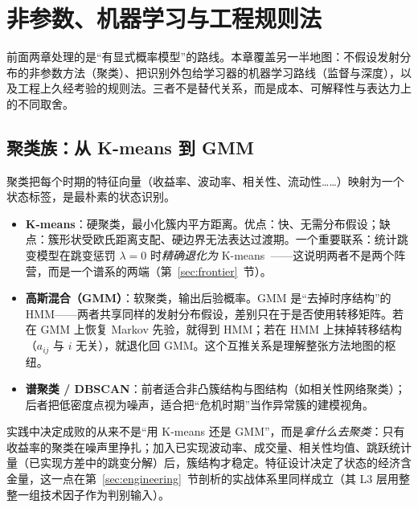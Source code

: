 
\section{非参数、机器学习与工程规则法}

前面两章处理的是“有显式概率模型”的路线。本章覆盖另一半地图：不假设发射分布的非参数方法（聚类）、把识别外包给学习器的机器学习路线（监督与深度），以及工程上久经考验的规则法。三者不是替代关系，而是成本、可解释性与表达力上的不同取舍。

\subsection{聚类族：从 K-means 到 GMM}

聚类把每个时期的特征向量（收益率、波动率、相关性、流动性……）映射为一个状态标签，是最朴素的状态识别。

\begin{itemize}[itemsep=2pt]
\item \textbf{K-means}：硬聚类，最小化簇内平方距离。优点：快、无需分布假设；缺点：簇形状受欧氏距离支配、硬边界无法表达过渡期。一个重要联系：统计跳变模型在跳变惩罚 $\lambda = 0$ 时\emph{精确退化为} K-means~\cite{shu2024a}——这说明两者不是两个阵营，而是一个谱系的两端（第~\ref{sec:frontier}~节）。
\item \textbf{高斯混合（GMM）}：软聚类，输出后验概率。GMM 是“去掉时序结构”的 HMM——两者共享同样的发射分布假设，差别只在于是否使用转移矩阵。若在 GMM 上恢复 Markov 先验，就得到 HMM；若在 HMM 上抹掉转移结构（$a_{ij}$ 与 $i$ 无关），就退化回 GMM。这个互推关系是理解整张方法地图的枢纽。
\item \textbf{谱聚类 / DBSCAN}：前者适合非凸簇结构与图结构（如相关性网络聚类）；后者把低密度点视为噪声，适合把“危机时期”当作异常簇的建模视角。
\end{itemize}

\begin{remark}[聚类的真正难点是特征而不是算法]
实践中决定成败的从来不是“用 K-means 还是 GMM”，而是\emph{拿什么去聚类}：只有收益率的聚类在噪声里挣扎；加入已实现波动率、成交量、相关性均值、跳跃统计量（已实现方差中的跳变分解）后，簇结构才稳定。特征设计决定了状态的经济含金量，这一点在第~\ref{sec:engineering}~节剖析的实战体系里同样成立（其 L3 层用整整一组技术因子作为判别输入）。
\end{remark}

